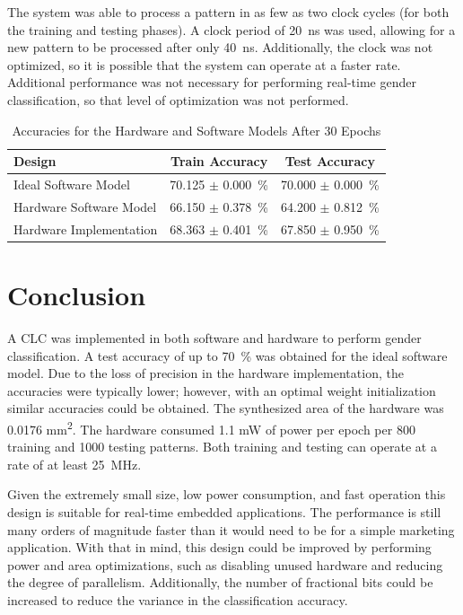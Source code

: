 \documentclass[10pt,journal]{IEEEtran}
\begin{document}
		The system was able to process a pattern in as few as two clock cycles (for both the training and testing phases). A clock period of 20~ns was used, allowing for a new pattern to be processed after only 40~ns. Additionally, the clock was not optimized, so it is possible that the system can operate at a faster rate. Additional performance was not necessary for performing real-time gender classification, so that level of optimization was not performed.
		
		\begin{table}[!t]
			\renewcommand{\arraystretch}{1.3}
			\caption{Accuracies for the Hardware and Software Models After 30 Epochs}
			\label{table:accuracy_results}
			\centering
			\begin{tabular}{lcc}
				\hline
				Design                  & Train Accuracy           & Test Accuracy          \\
				\hline
				Ideal Software Model    & 70.125 \(\pm\) 0.000~\% & 70.000 \(\pm\) 0.000~\% \\
				Hardware Software Model & 66.150 \(\pm\) 0.378~\% & 64.200 \(\pm\) 0.812~\% \\
				Hardware Implementation & 68.363 \(\pm\) 0.401~\% & 67.850 \(\pm\) 0.950~\% \\
				\hline
			\end{tabular}
		\end{table}		
	
	\section{Conclusion}
		A CLC was implemented in both software and hardware to perform gender classification. A test accuracy of up to 70~\% was obtained for the ideal software model. Due to the loss of precision in the hardware implementation, the accuracies were typically lower; however, with an optimal weight initialization similar accuracies could be obtained. The synthesized area of the hardware was 0.0176 mm\textsuperscript{2}. The hardware consumed 1.1 mW of power per epoch per 800 training and 1000 testing patterns. Both training and testing can operate at a rate of at least 25~MHz.
		
		Given the extremely small size, low power consumption, and fast operation this design is suitable for real-time embedded applications. The performance is still many orders of magnitude faster than it would need to be for a simple marketing application. With that in mind, this design could be improved by performing power and area optimizations, such as disabling unused hardware and reducing the degree of parallelism. Additionally, the number of fractional bits could be increased to reduce the variance in the classification accuracy.
	
	
		
	
\end{document}

